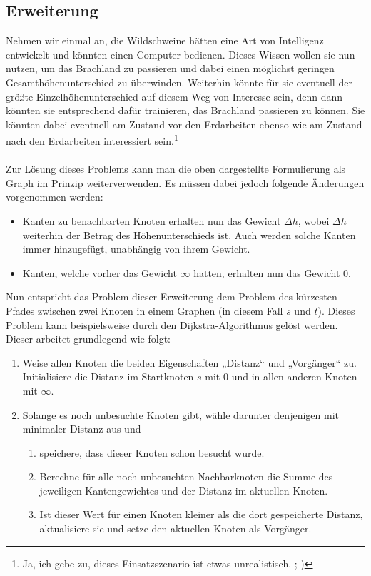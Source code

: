 \documentclass[a4paper, notitlepage, 12pt]{scrartcl}
\begin{document}
\subsection{Erweiterung}
Nehmen wir einmal an, die Wildschweine hätten eine Art von Intelligenz entwickelt und könnten einen Computer bedienen. Dieses Wissen wollen sie nun nutzen, um das Brachland zu passieren und dabei einen möglichst geringen Gesamthöhenunterschied zu überwinden. Weiterhin könnte für sie eventuell der größte Einzelhöhenunterschied auf diesem Weg von Interesse sein, denn dann könnten sie entsprechend dafür trainieren, das Brachland passieren zu können. Sie könnten dabei eventuell am Zustand vor den Erdarbeiten ebenso wie am Zustand nach den Erdarbeiten interessiert sein.\footnote{Ja, ich gebe zu, dieses Einsatzszenario ist etwas unrealistisch. ;-)}\\ \\
Zur Lösung dieses Problems kann man die oben dargestellte Formulierung als Graph im Prinzip weiterverwenden. Es müssen dabei jedoch folgende Änderungen vorgenommen werden:
\begin{itemize}
\item Kanten zu benachbarten Knoten erhalten nun das Gewicht $\Delta h$, wobei $\Delta h$ weiterhin der Betrag des Höhenunterschieds ist. Auch werden solche Kanten immer hinzugefügt, unabhängig von ihrem Gewicht.
\item Kanten, welche vorher das Gewicht $\infty$ hatten, erhalten nun das Gewicht $0$.
\end{itemize}
Nun entspricht das Problem dieser Erweiterung dem Problem des kürzesten Pfades zwischen zwei Knoten in einem Graphen (in diesem Fall $s$ und $t$). Dieses Problem kann beispielsweise durch den Dijkstra-Algorithmus gelöst werden. Dieser arbeitet grundlegend wie folgt:
\begin{enumerate}
\item Weise allen Knoten die beiden Eigenschaften „Distanz“ und „Vorgänger“ zu. Initialisiere die Distanz im Startknoten $s$ mit 0 und in allen anderen Knoten mit $\infty$.
\item Solange es noch unbesuchte Knoten gibt, wähle darunter denjenigen mit minimaler Distanz aus und
\begin{enumerate}
\item speichere, dass dieser Knoten schon besucht wurde.
\item Berechne für alle noch unbesuchten Nachbarknoten die Summe des jeweiligen Kantengewichtes und der Distanz im aktuellen Knoten.
\item Ist dieser Wert für einen Knoten kleiner als die dort gespeicherte Distanz, aktualisiere sie und setze den aktuellen Knoten als Vorgänger.
\end{enumerate}
\end{enumerate}
\end{document}
